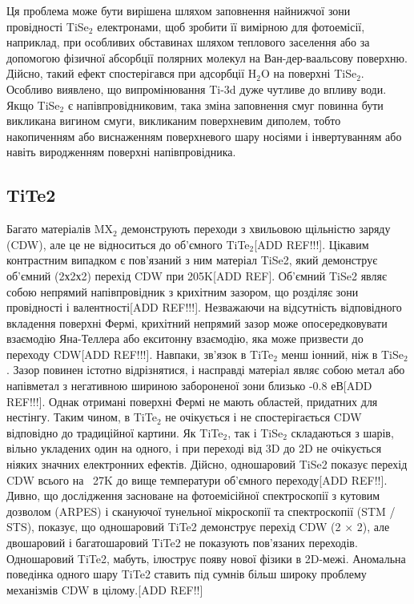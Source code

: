 Ця проблема може бути вирішена шляхом заповнення найнижчої зони провідності TiSe$_2$ електронами, щоб зробити її вимірною для фотоемісії, наприклад, при особливих обставинах шляхом теплового заселення або за допомогою фізичної абсорбції полярних молекул на Ван-дер-ваальсову поверхню. Дійсно, такий ефект спостерігався при адсорбції H$_2$O на поверхні TiSe$_2$. Особливо виявлено, що випромінювання Ti-3d дуже чутливе до впливу води. Якщо TiSe$_2$ є напівпровідниковим, така зміна заповнення смуг повинна бути викликана вигином смуги, викликаним поверхневим диполем, тобто накопиченням або виснаженням поверхневого шару носіями і інвертуванням або навіть виродженням поверхні напівпровідника.
\subsection{TiTe2}
Багато матеріалів MX$_2$ демонструють переходи з хвильовою щільністю заряду (CDW), але це не відноситься до об'ємного TiTe$_2$[ADD REF!!!]. Цікавим контрастним випадком є пов'язаний з ним матеріал TiSe2, який демонструє об'ємний (2х2х2) перехід CDW при 205K[ADD REF]. Об'ємний TiSe2 являє собою непрямий напівпровідник з крихітним зазором, що розділяє зони провідності і валентності[ADD REF!!!]. Незважаючи на відсутність відповідного вкладення поверхні Фермі, крихітний непрямий зазор може опосередковувати взаємодію Яна-Теллера або екситонну взаємодію, яка може призвести до переходу CDW[ADD REF!!!]. Навпаки, зв'язок в TiTe$_2$ менш іонний, ніж в TiSe$_2$. Зазор повинен істотно відрізнятися, і насправді матеріал являє собою метал або напівметал з негативною шириною забороненої зони близько -0.8 $еВ$[ADD REF!!!]. Однак отримані поверхні Фермі не мають областей, придатних для нестінгу. Таким чином, в TiTe$_2$ не очікується і не спостерігається CDW відповідно до традиційної картини. Як TiTe$_2$, так і TiSe$_2$ складаються з шарів, вільно укладених один на одного, і при переході від 3D до 2D не очікується ніяких значних електронних ефектів. Дійсно, одношаровий TiSe2 показує перехід CDW всього на ~27K до вище температури об'ємного переходу[ADD REF!!].
Дивно, що дослідження засноване на фотоемісійної спектроскопії з кутовим дозволом (ARPES) і скануючої тунельної мікроскопії та спектроскопії (STM / STS), показує, що одношаровий TiTe2 демонструє перехід CDW (2 × 2), але двошаровий і багатошаровий TiTe2 не показують пов'язаних переходів. Одношаровий TiTe2, мабуть, ілюструє появу нової фізики в 2D-межі. Аномальна поведінка одного шару TiTe2 ставить під сумнів більш широку проблему механізмів CDW в цілому.[ADD REF!!]
